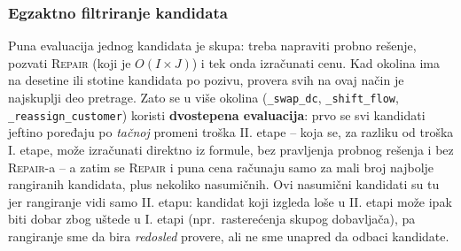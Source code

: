 \documentclass[12pt,a4paper]{article}
\begin{document}
\subsubsection{Egzaktno filtriranje kandidata}
\label{sec:egzaktno-filtriranje}

Puna evaluacija jednog kandidata je skupa: treba napraviti probno rešenje,
pozvati \textsc{Repair} (koji je $O(I \times J)$) i tek onda izračunati cenu.
Kad okolina ima na desetine ili stotine kandidata po pozivu, provera svih na
ovaj način je najskuplji deo pretrage. Zato se u više okolina
(\texttt{\_swap\_dc}, \texttt{\_shift\_flow}, \texttt{\_reassign\_customer})
koristi \textbf{dvostepena evaluacija}: prvo se svi kandidati jeftino
poređaju po \emph{tačnoj} promeni troška II. etape -- koja se, za razliku od
troška I. etape, može izračunati direktno iz formule, bez pravljenja probnog
rešenja i bez \textsc{Repair}-a -- a zatim se \textsc{Repair} i puna cena
računaju samo za mali broj najbolje rangiranih kandidata, plus nekoliko
nasumičnih. Ovi nasumični kandidati su tu jer rangiranje vidi samo II. etapu:
kandidat koji izgleda loše u II. etapi može ipak biti dobar zbog uštede u I.
etapi (npr.\ rasterećenja skupog dobavljača), pa rangiranje sme da bira
\emph{redosled} provere, ali ne sme unapred da odbaci kandidate.
\end{document}
